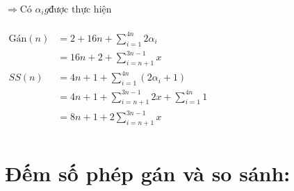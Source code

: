 \documentclass[12pt, letterpaper]{article}
\begin{document}
{{{	$\Rightarrow \text{Có } \alpha_i g \text{được thực hiện }$  \\
	 \\
	$ \begin{aligned}
		\text{Gán}(n) & = 2 + 16n + \sum^{4n}_{i = 1} 2 \alpha_i \\
			& = 16n + 2 + \sum^{3n-1}_{i = n + 1} x\\
		SS(n) & = 4n + 1 + \sum^{4n}_{i = 1} (2 \alpha_i + 1) \\
			& = 4n + 1 + \sum^{3n-1}_{i = n + 1} 2x + \sum^{4n}_{i = 1} 1 \\
			& = 8n + 1 + 2\sum^{3n-1}_{i = n + 1} x \\
	\end{aligned} $ \\
\section{Đếm số phép gán và so sánh:}

}}}
\end{document}
